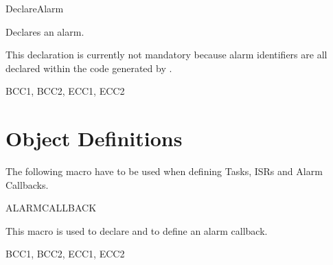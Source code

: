 \begin{function_nopb}{DeclareAlarm}
  \begin{fundescription}
    Declares an alarm.

    This declaration is currently not mandatory because alarm
    identifiers are all declared within the code generated by \rtd.
  \end{fundescription}
  \begin{funconformance}
    BCC1, BCC2, ECC1, ECC2
  \end{funconformance}
\end{function_nopb}


\pagebreak











\section{Object Definitions}
The following macro have to be used when defining Tasks, ISRs and
Alarm Callbacks.

\begin{function_nopb}{ALARMCALLBACK}
  \begin{fundescription}
    This macro is used to declare and to define an alarm callback.
  \end{fundescription}
  \begin{funparameters}
  \end{funparameters}
  \begin{funconformance}
    BCC1, BCC2, ECC1, ECC2
  \end{funconformance}
\end{function_nopb}











